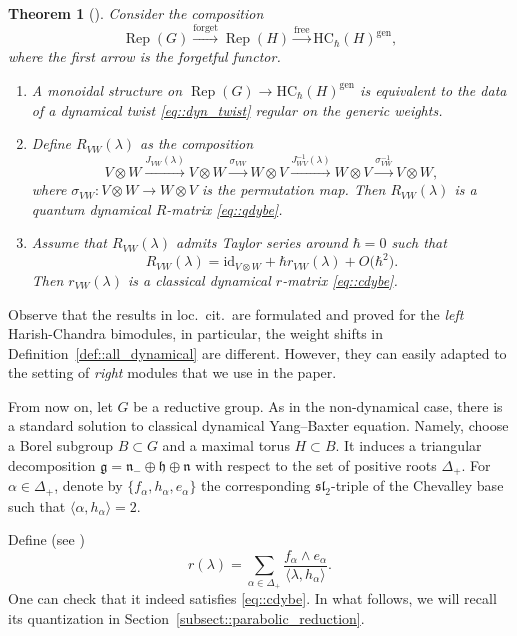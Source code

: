 \documentclass[10pt,a4paper]{article}
\numberwithin{equation}{section}
\newtheorem{Theorem}{Theorem}[section]
\newcommand{\g}{\mathfrak{g}}
\newcommand{\h}{\mathfrak{h}}
\newcommand{\n}{\mathfrak{n}}
\renewcommand{\sl}{\mathfrak{sl}}
\newcommand{\free}{\mathrm{free}}
\newcommand{\gen}{\mathrm{gen}}
\newcommand{\HC}{\mathrm{HC}_{\hbar}}
\newcommand{\id}{\mathrm{id}}
\DeclareMathOperator{\Rep}{Rep}
\begin{document}
	\begin{Theorem}[{\cite{KalmykovSafronov}}]
		\label{thm::dynamical_tannakian}
		Consider the composition
		\[
		\Rep(G) \xrightarrow{\mathrm{forget}} \Rep(H) \xrightarrow{\free} \HC(H)^{\gen},
		\]
		where the first arrow is the forgetful functor.
		\begin{enumerate}\itemsep=0pt
			\item[$(1)$] A monoidal structure on $\Rep(G) \rightarrow \HC(H)^{\gen}$ is equivalent to the data of a dynamical twist \eqref{eq::dyn_twist} regular on the generic weights.
			\item[$(2)$] Define $R_{VW}(\lambda)$ as the composition
			\[
			V\otimes W \xrightarrow{J_{VW}(\lambda)} V \otimes W \xrightarrow{\sigma_{VW}} W \otimes V \xrightarrow{J_{WV}^{-1}(\lambda)} W \otimes V \xrightarrow{\sigma_{VW}^{-1}} V \otimes W,
			\]
			where $\sigma_{VW} \colon V \otimes W \rightarrow W \otimes V$ is the permutation map. Then $R_{VW}(\lambda)$ is a quantum dynamical $R$-matrix \eqref{eq::qdybe}.
			\item[$(3)$] Assume that $R_{VW}(\lambda)$ admits Taylor series around $\hbar=0$ such that
			\[R_{VW} (\lambda)= \id_{V \otimes W} + \hbar r_{VW}(\lambda) + O\bigl(\hbar^2\bigr). \]
			Then $r_{VW}(\lambda)$ is a classical dynamical $r$-matrix \eqref{eq::cdybe}.
		\end{enumerate}
	\end{Theorem}
	
	\begin{Remark}
		Observe that the results in loc.\ cit.\  are formulated and proved for the \emph{left} Harish-Chandra bimodules, in particular, the weight shifts in Definition~\ref{def::all_dynamical} are different. However, they can easily adapted to the setting of \emph{right} modules that we use in the paper.
	\end{Remark}
	
	
	From now on, let $G$ be a reductive group. As in the non-dynamical case, there is a standard solution to classical dynamical Yang--Baxter equation. Namely, choose a Borel subgroup $B\subset G$ and a maximal torus $H \subset B$. It induces a triangular decomposition $\g = \n_- \oplus \h \oplus \n$ with respect to the set of positive roots $\Delta_+$. For $\alpha\in \Delta_+$, denote by $\{f_{\alpha}, h_{\alpha}, e_{\alpha}\}$ the corresponding $\sl_2$-triple of the Chevalley base such that $\langle \alpha,h_{\alpha} \rangle =2$.
	
	Define (see \cite{EtingofVarchenkoExchange})
	\begin{equation}
		\label{eq::standard_sol_cdybe}
		r(\lambda) = \sum_{\alpha \in \Delta_+} \frac{f_{\alpha} \wedge e_{\alpha}}{\langle\lambda,h_{\alpha} \rangle }.
	\end{equation}
	One can check that it indeed satisfies \eqref{eq::cdybe}. In what follows, we will recall its quantization in Section~\ref{subsect::parabolic_reduction}.
	
\end{document}

